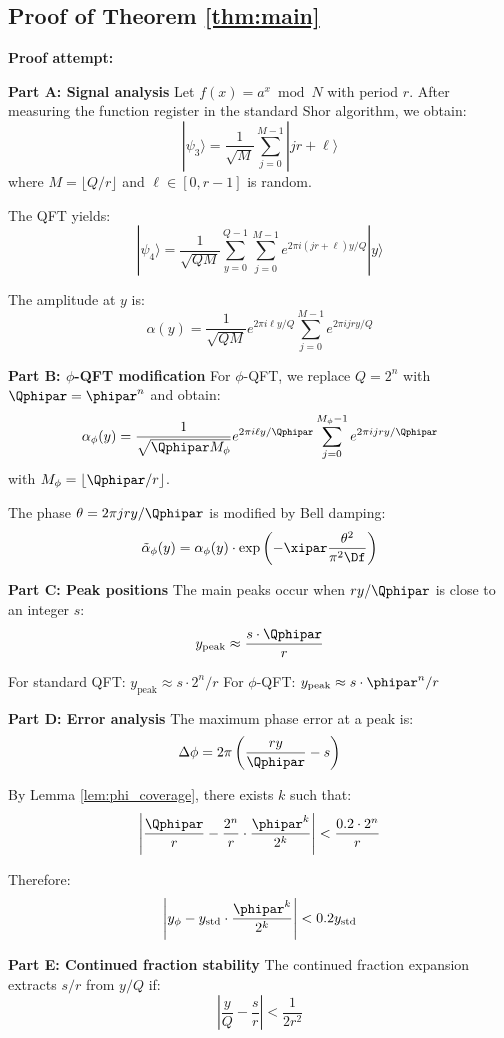 \subsection{Proof of Theorem \ref{thm:main}}
\label{app:proof_main}

\textbf{Proof attempt:}

\textbf{Part A: Signal analysis}
Let $f(x) = a^x \bmod N$ with period $r$. After measuring the function register in the standard Shor algorithm, we obtain:
\[
|\psi_3\rangle = \frac{1}{\sqrt{M}} \sum_{j=0}^{M-1} |jr + \ell\rangle
\]
where $M = \lfloor Q/r \rfloor$ and $\ell \in [0, r-1]$ is random.

The QFT yields:
\[
|\psi_4\rangle = \frac{1}{\sqrt{QM}} \sum_{y=0}^{Q-1} \sum_{j=0}^{M-1} e^{2\pi i (jr + \ell)y/Q} |y\rangle
\]

The amplitude at $y$ is:
\[
\alpha(y) = \frac{1}{\sqrt{QM}} e^{2\pi i \ell y/Q} \sum_{j=0}^{M-1} e^{2\pi i j r y/Q}
\]

\textbf{Part B: $\phi$-QFT modification}
For $\phi$-QFT, we replace $Q = 2^n$ with $\Qphipar = \phipar^n$ and obtain:
\[
\alpha_{\phi}(y) = \frac{1}{\sqrt{\Qphipar M_{\phi}}} e^{2\pi i \ell y/\Qphipar} \sum_{j=0}^{M_{\phi}-1} e^{2\pi i j r y/\Qphipar}
\]
with $M_{\phi} = \lfloor \Qphipar/r \rfloor$.

The phase $\theta = 2\pi j r y/\Qphipar$ is modified by Bell damping:
\[
\tilde{\alpha}_{\phi}(y) = \alpha_{\phi}(y) \cdot \exp\left(-\xipar \frac{\theta^2}{\pi^2 \Df}\right)
\]

\textbf{Part C: Peak positions}
The main peaks occur when $ry/\Qphipar$ is close to an integer $s$:
\[
y_{\text{peak}} \approx \frac{s \cdot \Qphipar}{r}
\]

For standard QFT: $y_{\text{peak}} \approx s \cdot 2^n / r$
For $\phi$-QFT: $y_{\text{peak}} \approx s \cdot \phipar^n / r$

\textbf{Part D: Error analysis}
The maximum phase error at a peak is:
\[
\Delta\phi = 2\pi \left( \frac{ry}{\Qphipar} - s \right)
\]

By Lemma \ref{lem:phi_coverage}, there exists $k$ such that:
\[
\left| \frac{\Qphipar}{r} - \frac{2^n}{r} \cdot \frac{\phipar^k}{2^k} \right| < \frac{0.2 \cdot 2^n}{r}
\]

Therefore:
\[
\left| y_{\phi} - y_{\text{std}} \cdot \frac{\phipar^k}{2^k} \right| < 0.2 y_{\text{std}}
\]

\textbf{Part E: Continued fraction stability}
The continued fraction expansion extracts $s/r$ from $y/Q$ if:
\[
\left| \frac{y}{Q} - \frac{s}{r} \right| < \frac{1}{2r^2}
\]


